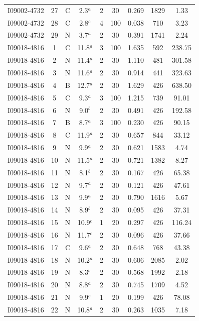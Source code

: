 \begin{table}
\begin{tabular}{ccccccccc}
I09002-4732 & 27 & C & 2.3$^{a}$ & 2 & 30 & 0.269 & 1829 & 1.33 \\
I09002-4732 & 28 & C & 2.8$^{c}$ & 4 & 100 & 0.038 & 710 & 3.23 \\
I09002-4732 & 29 & N & 3.7$^{a}$ & 2 & 30 & 0.391 & 1741 & 2.24 \\
I09018-4816 & 1 & C & 11.8$^{a}$ & 3 & 100 & 1.635 & 592 & 238.75 \\
I09018-4816 & 2 & N & 11.4$^{a}$ & 2 & 30 & 1.110 & 481 & 301.58 \\
I09018-4816 & 3 & N & 11.6$^{a}$ & 2 & 30 & 0.914 & 441 & 323.63 \\
I09018-4816 & 4 & B & 12.7$^{a}$ & 2 & 30 & 1.629 & 426 & 638.50 \\
I09018-4816 & 5 & C & 9.3$^{a}$ & 3 & 100 & 1.215 & 739 & 91.01 \\
I09018-4816 & 6 & N & 9.0$^{b}$ & 2 & 30 & 0.491 & 426 & 192.58 \\
I09018-4816 & 7 & B & 8.7$^{a}$ & 3 & 100 & 0.230 & 426 & 90.15 \\
I09018-4816 & 8 & C & 11.9$^{a}$ & 2 & 30 & 0.657 & 844 & 33.12 \\
I09018-4816 & 9 & N & 9.9$^{a}$ & 2 & 30 & 0.621 & 1583 & 4.74 \\
I09018-4816 & 10 & N & 11.5$^{a}$ & 2 & 30 & 0.721 & 1382 & 8.27 \\
I09018-4816 & 11 & N & 8.1$^{b}$ & 2 & 30 & 0.167 & 426 & 65.38 \\
I09018-4816 & 12 & N & 9.7$^{a}$ & 2 & 30 & 0.121 & 426 & 47.61 \\
I09018-4816 & 13 & N & 9.9$^{a}$ & 2 & 30 & 0.790 & 1616 & 5.67 \\
I09018-4816 & 14 & N & 8.9$^{b}$ & 2 & 30 & 0.095 & 426 & 37.31 \\
I09018-4816 & 15 & N & 10.9$^{c}$ & 1 & 20 & 0.297 & 426 & 116.24 \\
I09018-4816 & 16 & N & 11.7$^{c}$ & 2 & 30 & 0.096 & 426 & 37.66 \\
I09018-4816 & 17 & C & 9.6$^{a}$ & 2 & 30 & 0.648 & 768 & 43.38 \\
I09018-4816 & 18 & N & 10.2$^{a}$ & 2 & 30 & 0.606 & 2085 & 2.02 \\
I09018-4816 & 19 & N & 8.3$^{b}$ & 2 & 30 & 0.568 & 1992 & 2.18 \\
I09018-4816 & 20 & N & 8.8$^{a}$ & 2 & 30 & 0.745 & 1709 & 4.52 \\
I09018-4816 & 21 & N & 9.9$^{c}$ & 1 & 20 & 0.199 & 426 & 78.08 \\
I09018-4816 & 22 & N & 10.8$^{a}$ & 2 & 30 & 0.263 & 1035 & 7.18 \\

\end{tabular}
\end{table}

